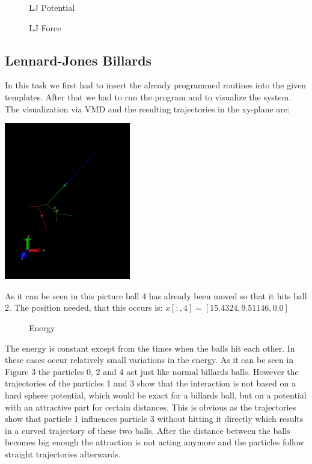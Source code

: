 \documentclass[12pt,a4paper]{scrartcl}
\begin{document}
\begin{figure}[H]
	\resizebox{1\textwidth}{!}{}
	\caption{LJ Potential}\label{fig:Potential_LJ}
\end{figure}
\begin{figure}[H]
	\resizebox{1\textwidth}{!}{}
	\caption{LJ Force}\label{fig:Force_LJ}
\end{figure}
\newpage
\subsection{Lennard-Jones Billards}
In this task we first had to insert the already programmed routines into the given templates. After that we had to run the program and to  visualize the system. The visualization via VMD and the resulting trajectories in the xy-plane are:\\
\begin{minipage}[hbt]{0cm}
\centering
	
\end{minipage}
\begin{minipage}[hbt]{15cm}
	\includegraphics[width=5.5cm]{../plots/vmd_2_ljbillards/vmdscene.png}
\end{minipage}


As it can be seen in this picture ball 4 has already been moved so that it hits ball 2.
The position needed, that this occurs is: $x[:,4] = [15.4324, 9.51146, 0.0]$

\begin{figure}[H]
	\resizebox{1\textwidth}{!}{}
	\caption{Energy}\label{fig:Energy}
\end{figure}
The energy is constant except from the times when the balls hit each other. In these cases occur relatively small variations in the energy.
As it can be seen in Figure 3 %
the particles 0, 2 and 4 act just like normal billards balls. However the trajectories of the particles 1 and 3 show that the interaction is not based on a hard sphere potential, which would be exact for a billards ball, but on a potential with an attractive part for certain distances.  This is obvious as the trajectories show that particle 1 influences particle 3 without hitting it directly which results in a curved trajectory of these two balls. After the distance between the balls becomes big enough the attraction is not acting anymore and the particles follow straight trajectories afterwards.
\end{document}
